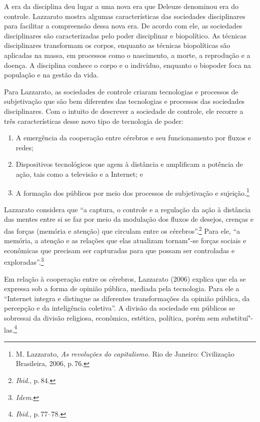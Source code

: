 A era da disciplina deu lugar a uma nova era que Deleuze denominou era
do controle. Lazzarato mostra algumas características das
sociedades disciplinares para facilitar a compreensão dessa nova era. De
acordo com ele, as sociedades disciplinares são caracterizadas pelo
poder disciplinar e biopolítico. As técnicas disciplinares transformam
os corpos, enquanto as técnicas biopolíticas são aplicadas na massa, em
processos como o nascimento, a morte, a reprodução e a doença. A
disciplina conhece o corpo e o indivíduo, enquanto o biopoder foca na
população e na gestão da vida.

Para Lazzarato, as sociedades de controle criaram tecnologias e
processos de subjetivação que são bem diferentes das tecnologias e
processos das sociedades disciplinares. Com o intuito de descrever a
sociedade de controle, ele recorre a três características desse novo
tipo de tecnologia de poder: 

\begin{enumerate}
\item A emergência da cooperação entre
cérebros e seu funcionamento por fluxos e redes;

\item Dispositivos
tecnológicos que agem à distância e amplificam a potência de ação, tais
como a televisão e a Internet; e 

\item A formação dos públicos por meio dos
processos de subjetivação e sujeição.\footnote{M. Lazzarato, \textit{As revoluções do capitalismo.} Rio de Janeiro: Civilização Brasileira, 2006, p.\,76.}
\end{enumerate}

Lazzarato considera que ``a captura, o controle e a regulação da
ação à distância das mentes entre si se faz por meio da modulação dos
fluxos de desejos, crenças e das forças (memória e atenção) que circulam
entre os cérebros''.\footnote{\textit{Ibid}., p.\,84.} Para ele, ``a memória, a atenção e as
relações que elas atualizam tornam"-se forças sociais e econômicas que
precisam ser capturadas para que possam ser controladas e exploradas''.\footnote{\textit{Idem}.}

Em relação à cooperação entre os cérebros, Lazzarato (2006) explica que
ela se expressa sob a forma de opinião pública, mediada pela tecnologia.
Para ele a ``Internet integra e distingue as diferentes transformações
da opinião pública, da percepção e da inteligência coletiva''. A divisão
da sociedade em públicos se sobressai da divisão religiosa, econômica,
estética, política, porém sem substituí"-las.\footnote{\textit{Ibid}., p.\,77--78.}

